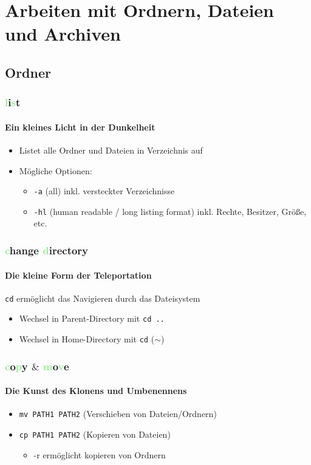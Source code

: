 \documentclass[12pt,utf8]{beamer}
\begin{document}
\section{Arbeiten mit Ordnern, Dateien und Archiven}
\subsection{Ordner}
\begin{frame}
	\frametitle{\textcolor{lightGreen}{l}i\textcolor{lightGreen}{s}t}
	\framesubtitle{Ein kleines Licht in der Dunkelheit}
	\begin{itemize}
		\item Listet alle Ordner und Dateien in Verzeichnis auf
		\item Mögliche Optionen:
		\begin{itemize}[<+->]
			\item \texttt{-a}  (all) inkl. versteckter Verzeichnisse
			\item \texttt{-hl}  (human readable / long listing format) inkl. Rechte, Besitzer, Größe, etc.
		\end{itemize}
	\end{itemize}
\end{frame}

\begin{frame}
	\frametitle{\textcolor{lightGreen}{c}hange \textcolor{lightGreen}{d}irectory}
	\framesubtitle{Die kleine Form der Teleportation}
	\texttt{cd} ermöglicht das Navigieren durch das Dateisystem
	\begin{itemize}
		\item Wechsel in Parent-Directory mit \texttt{cd ..}
		\item Wechsel in Home-Directory mit \texttt{cd} ($\sim$)
	\end{itemize}
\end{frame}

\begin{frame}
\frametitle{\textcolor{lightGreen}{c}o\textcolor{lightGreen}{p}y $\&$ \textcolor{lightGreen}{m}o\textcolor{lightGreen}{v}e}
\framesubtitle{Die Kunst des Klonens und Umbenennens}
\begin{itemize}
	\item \texttt{mv PATH1 PATH2} (Verschieben von Dateien/Ordnern)
	\item \texttt{cp PATH1 PATH2} (Kopieren von Dateien)
	\begin{itemize}
		\item -r ermöglicht kopieren von Ordnern
	\end{itemize}
\end{itemize}
\end{frame}
\end{document}
